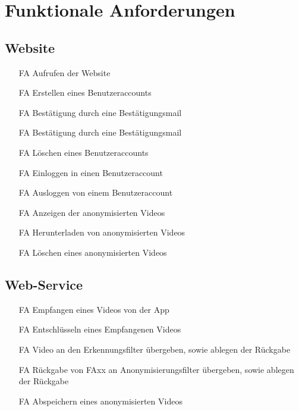 \section{Funktionale Anforderungen}

\subsection{Website}
\begin{itemize}
\item[FA] Aufrufen der Website

\item[FA] Erstellen eines Benutzeraccounts

\item[FA] Bestätigung durch eine Bestätigungsmail

\item[FA] Bestätigung durch eine Bestätigungsmail

\item[FA] Löschen eines Benutzeraccounts

\item[FA] Einloggen in einen Benutzeraccount

\item[FA] Ausloggen von einem Benutzeraccount

\item[FA] Anzeigen der anonymisierten Videos

\item[FA] Herunterladen von anonymisierten Videos

\item[FA] Löschen eines anonymisierten Videos
\end{itemize}

\subsection{Web-Service}
\begin{itemize}
\item[FA] Empfangen eines Videos von der App

\item[FA] Entschlüsseln eines Empfangenen Videos

\item[FA] Video an den Erkennungsfilter übergeben, sowie ablegen der Rückgabe

\item[FA] Rückgabe von FAxx an Anonymisierungsfilter übergeben, sowie ablegen der Rückgabe

\item[FA] Abspeichern eines anonymisierten Videos
\end{itemize}


